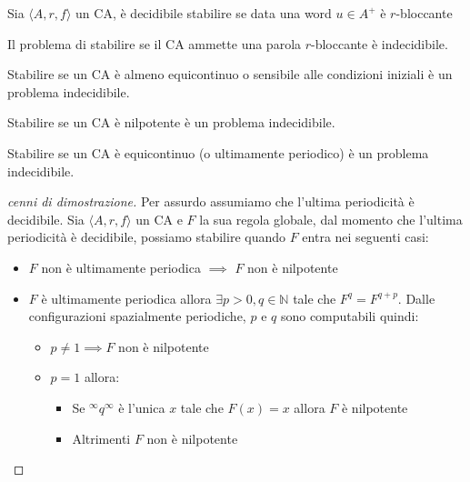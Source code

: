 \begin{teorema}
    Sia $\langle A,r,f\rangle$ un CA, è decidibile stabilire se data una word $u\in A^+$
    è $r$-bloccante
\end{teorema}

\begin{teorema}
    Il problema di stabilire se il CA ammette una parola $r$-bloccante
    è indecidibile.
\end{teorema}

\begin{teorema}
    Stabilire se un CA è almeno equicontinuo o sensibile alle condizioni iniziali
    è un problema indecidibile.
\end{teorema}

\begin{teorema}
    Stabilire se un CA è nilpotente è un problema indecidibile.
\end{teorema}

\begin{teorema}
    Stabilire se un CA è equicontinuo (o ultimamente periodico) è un problema indecidibile.
    \begin{proof} [cenni di dimostrazione]
        Per assurdo assumiamo che l'ultima periodicità è decidibile. Sia
        $\langle A,r,f\rangle$  un CA e $F$ la sua regola globale, dal momento
        che l'ultima periodicità è decidibile, possiamo stabilire quando $F$ entra
        nei seguenti casi:
        \begin{itemize}
            \item $F$ non è ultimamente periodica $\implies$ $F$ non è nilpotente
            \item $F$ è ultimamente periodica allora $\exists p>0, q\in \mathbb{N}$
                  tale che $F^q=F^{q+p}$. Dalle configurazioni spazialmente periodiche,
                  $p$ e $q$ sono computabili quindi:
                  \begin{itemize}
                      \item $p\ne 1\implies F$ non è nilpotente
                      \item $p= 1$ allora:
                            \begin{itemize}
                                \item Se $^\infty q^\infty$ è l'unica $x$ tale che $F(x)=x$ allora
                                      $F$ è nilpotente
                                \item Altrimenti $F$ non è nilpotente
                            \end{itemize}
                  \end{itemize}
        \end{itemize}
    \end{proof}
\end{teorema}

